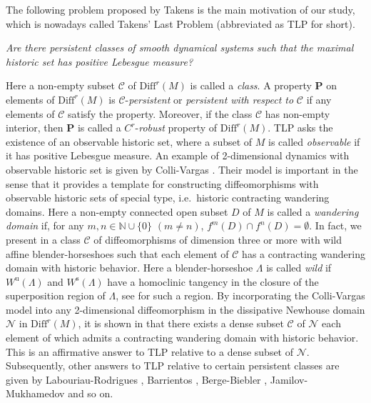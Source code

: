 \documentclass{amsart}
\theoremstyle{plain}
\theoremstyle{definition}
\theoremstyle{remark}
\numberwithin{equation}{section}
\def\smfd{W^{\mathrm{s}}}
\def\umfd{W^{\mathrm{u}}}
\begin{document}
The following problem proposed by Takens \cite{T08} is the main motivation of 
our study, which is nowadays called Takens' Last Problem 
(abbreviated as TLP for short).

\medskip
\emph{Are there persistent classes of smooth dynamical systems such that the maximal historic 
set has positive Lebesgue measure?}
\medskip

Here a non-empty subset $\mathcal{C}$ of $\mathrm{Diff}^r(M)$ is called a \emph{class}.
A property $\mathbf{P}$ on elements of $\mathrm{Diff}^r(M)$ is $\mathcal{C}$-\emph{persistent} or \emph{persistent with respect to} 
$\mathcal{C}$ if any elements of $\mathcal{C}$ satisfy the property.
Moreover, if the class $\mathcal{C}$ has non-empty interior, then $\mathbf{P}$ 
is called a $C^r$-\emph{robust} property of $\mathrm{Diff}^r(M)$.
TLP asks the existence of an observable historic set, 
where a subset of $M$ is called \emph{observable} if it has positive Lebesgue measure. 
An example of 2-dimensional dynamics with observable historic set is given by 
Colli-Vargas \cite{CV01}.
Their model is important in the sense that it provides a template for constructing 
diffeomorphisms with observable historic sets of special type, i.e.\ historic contracting wandering domains.
Here a non-empty connected open subset $D$ of $M$ is called a  \emph{wandering domain} 
if, for any $m,n\in \mathbb{N}\cup \{0\}$ $(m\neq n)$, 
$f^m(D)\cap f^n(D)=\emptyset$.
In fact, we present in \cite{KNS23} a class $\mathcal{C}$ of diffeomorphisms of dimension three or more with wild affine blender-horseshoes such that each element of $\mathcal{C}$ has a 
contracting wandering domain with historic behavior.
Here a blender-horseshoe $\Lambda$ is called \emph{wild} 
if $\umfd(\Lambda)$ and $\smfd(\Lambda)$ have 
a homoclinic tangency in the closure of the superposition region of $\Lambda$, 
see \cite[Section 6.2]{BDV05} for such a region.
By incorporating the Colli-Vargas model into any 2-dimensional diffeomorphism in the 
dissipative Newhouse domain $\mathcal{N}$ in $\mathrm{Diff}^r(M)$, it is shown 
in \cite{KS17} that there exists a dense subset $\mathcal{C}$ of $\mathcal{N}$ 
each element of which admits a contracting wandering domain with historic behavior.
This is an affirmative answer to TLP relative to a dense subset of $\mathcal{N}$.
Subsequently, other answers to TLP relative to certain persistent classes 
are given by Labouriau-Rodrigues \cite{LR17}, Barrientos \cite{B22}, Berge-Biebler \cite{BB23}, 
Jamilov-Mukhamedov \cite{JM} and so on.
 
\end{document}
